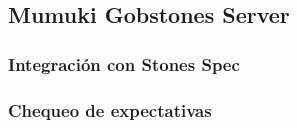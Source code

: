 \subsection{Mumuki Gobstones Server}
\subsubsection{Integración con Stones Spec}
\subsubsection{Chequeo de expectativas}
